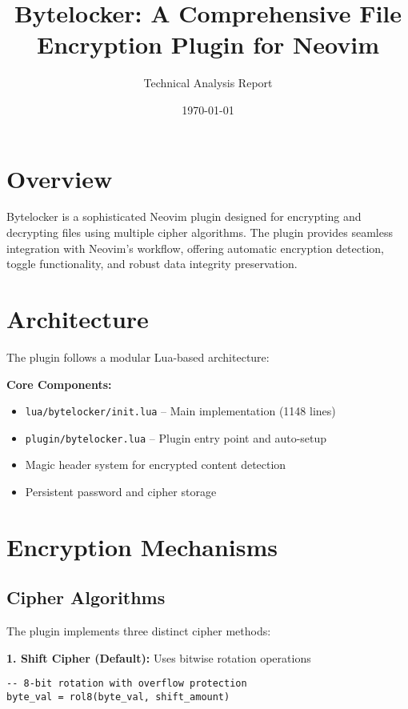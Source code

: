 \documentclass[11pt,a4paper]{article}
\begin{document}
\title{\textbf{Bytelocker: A Comprehensive File Encryption Plugin for Neovim}}
\author{Technical Analysis Report}
\date{\today}
\maketitle

\vspace{-15pt}

\begin{multicols}{2}

\section{Overview}
Bytelocker is a sophisticated Neovim plugin designed for encrypting and decrypting files using multiple cipher algorithms. The plugin provides seamless integration with Neovim's workflow, offering automatic encryption detection, toggle functionality, and robust data integrity preservation.

\section{Architecture}

The plugin follows a modular Lua-based architecture:

\textbf{Core Components:}
\begin{itemize}
    \item \texttt{lua/bytelocker/init.lua} -- Main implementation (1148 lines)
    \item \texttt{plugin/bytelocker.lua} -- Plugin entry point and auto-setup
    \item Magic header system for encrypted content detection
    \item Persistent password and cipher storage
\end{itemize}

\section{Encryption Mechanisms}

\subsection{Cipher Algorithms}
The plugin implements three distinct cipher methods:

\textbf{1. Shift Cipher (Default):} Uses bitwise rotation operations
\begin{lstlisting}[basicstyle=\ttfamily\tiny]
-- 8-bit rotation with overflow protection
byte_val = rol8(byte_val, shift_amount)
\end{lstlisting}


\end{multicols}
\end{document}
